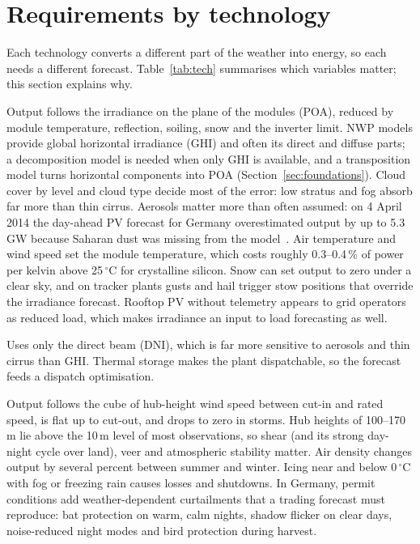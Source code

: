 \section{Requirements by technology}
\label{sec:tech}

Each technology converts a different part of the weather into energy, so each needs a different forecast. Table~\ref{tab:tech} summarises which variables matter; this section explains why.



 Output follows the irradiance on the plane of the modules (POA), reduced by module temperature, reflection, soiling, snow and the inverter limit. NWP models provide global horizontal irradiance (GHI) and often its direct and diffuse parts; a decomposition model is needed when only GHI is available, and a transposition model turns horizontal components into POA (Section~\ref{sec:foundations}). Cloud cover by level and cloud type decide most of the error: low stratus and fog absorb far more than thin cirrus. Aerosols matter more than often assumed: on 4 April 2014 the day-ahead PV forecast for Germany overestimated output by up to 5.3\,GW because Saharan dust was missing from the model~\cite{rieger2017dust}. Air temperature and wind speed set the module temperature, which costs roughly 0.3--0.4\,\% of power per kelvin above 25\,$^\circ$C for crystalline silicon. Snow can set output to zero under a clear sky, and on tracker plants gusts and hail trigger stow positions that override the irradiance forecast. Rooftop PV without telemetry appears to grid operators as reduced load, which makes irradiance an input to load forecasting as well.

 Uses only the direct beam (DNI), which is far more sensitive to aerosols and thin cirrus than GHI. Thermal storage makes the plant dispatchable, so the forecast feeds a dispatch optimisation.

 Output follows the cube of hub-height wind speed between cut-in and rated speed, is flat up to cut-out, and drops to zero in storms. Hub heights of 100--170\,m lie above the 10\,m level of most observations, so shear (and its strong day-night cycle over land), veer and atmospheric stability matter. Air density changes output by several percent between summer and winter. Icing near and below 0\,$^\circ$C with fog or freezing rain causes losses and shutdowns. In Germany, permit conditions add weather-dependent curtailments that a trading forecast must reproduce: bat protection on warm, calm nights, shadow flicker on clear days, noise-reduced night modes and bird protection during harvest.

